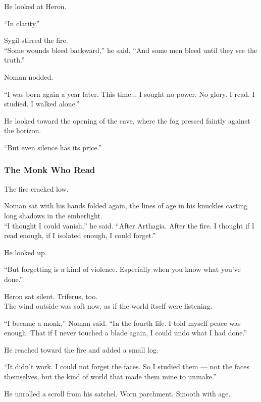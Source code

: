 \documentclass[12pt]{article}
\begin{document}
He looked at Heron.

“In clarity.”

\vspace{1em}

Sygil stirred the fire.\\
“Some wounds bleed backward,” he said. “And some men bleed until they see the truth.”

Noman nodded.

“I was born again a year later. This time... I sought no power. No glory. I read. I studied. I walked alone.”

He looked toward the opening of the cave, where the fog pressed faintly against the horizon.

“But even silence has its price.”

\dotfill

\subsubsection*{The Monk Who Read}

The fire cracked low.

Noman sat with his hands folded again, the lines of age in his knuckles casting long shadows in the emberlight.\\
“I thought I could vanish,” he said. “After Arthagia. After the fire. I thought if I read enough, if I isolated enough, I could forget.”

He looked up.

“But forgetting is a kind of violence. Especially when you know what you’ve done.”

\vspace{1em}

Heron sat silent. Triferus, too.\\
The wind outside was soft now, as if the world itself were listening.

“I became a monk,” Noman said. “In the fourth life. I told myself peace was enough. That if I never touched a blade again, I could undo what I had done.”

He reached toward the fire and added a small log.

“It didn’t work. I could not forget the faces. So I studied them — not the faces themselves, but the kind of world that made them mine to unmake.”

\vspace{1em}

He unrolled a scroll from his satchel. Worn parchment. Smooth with age.
\end{document}
